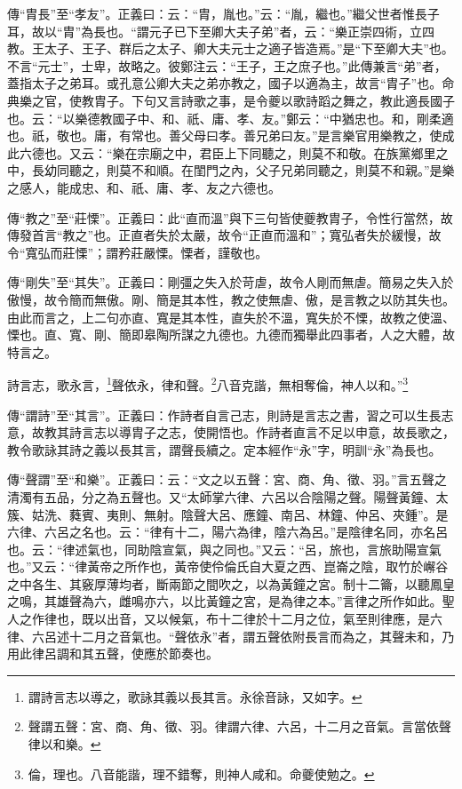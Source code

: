{\noindent\zhuan{}\fzbyks 傳“胄長”至“孝友”。正義曰：云：“胄，胤也。”云：“胤，繼也。”繼父世者惟長子耳，故以“胄”為長也。“謂元子已下至卿大夫子弟”者，云：“樂正崇四術，立四教。王太子、王子、群后之太子、卿大夫元士之適子皆造焉。”是“下至卿大夫”也。不言“元士”，士卑，故略之。彼鄭注云：“王子，王之庶子也。”此傳兼言“弟”者，蓋指太子之弟耳。或孔意公卿大夫之弟亦教之，國子以適為主，故言“胄子”也。命典樂之官，使教胄子。下句又言詩歌之事，是令夔以歌詩蹈之舞之，教此適長國子也。云：“以樂德教國子中、和、祇、庸、孝、友。”鄭云：“中猶忠也。和，剛柔適也。祇，敬也。庸，有常也。善父母曰孝。善兄弟曰友。”是言樂官用樂教之，使成此六德也。又云：“樂在宗廟之中，君臣上下同聽之，則莫不和敬。在族黨鄉里之中，長幼同聽之，則莫不和順。在閨門之內，父子兄弟同聽之，則莫不和親。”是樂之感人，能成忠、和、祇、庸、孝、友之六德也。 \par}

{\noindent\zhuan{}\fzbyks 傳“教之”至“莊慄”。正義曰：此“直而溫”與下三句皆使夔教胄子，令性行當然，故傳發首言“教之”也。正直者失於太嚴，故令“正直而溫和”；寬弘者失於緩慢，故令“寬弘而莊慄”；謂矜莊嚴慄。慄者，謹敬也。 \par}

{\noindent\zhuan{}\fzbyks 傳“剛失”至“其失”。正義曰：剛彊之失入於苛虐，故令人剛而無虐。簡易之失入於傲慢，故令簡而無傲。剛、簡是其本性，教之使無虐、傲，是言教之以防其失也。由此而言之，上二句亦直、寬是其本性，直失於不溫，寬失於不慄，故教之使溫、慄也。直、寬、剛、簡即皋陶所謀之九德也。九德而獨舉此四事者，人之大體，故特言之。 \par}

詩言志，歌永言，\footnote{謂詩言志以導之，歌詠其義以長其言。永徐音詠，又如字。}聲依永，律和聲。\footnote{聲謂五聲：宮、商、角、徵、羽。律謂六律、六呂，十二月之音氣。言當依聲律以和樂。}八音克諧，無相奪倫，神人以和。”\footnote{倫，理也。八音能諧，理不錯奪，則神人咸和。命夔使勉之。}

{\noindent\zhuan{}\fzbyks 傳“謂詩”至“其言”。正義曰：作詩者自言己志，則詩是言志之書，習之可以生長志意，故教其詩言志以導胄子之志，使開悟也。作詩者直言不足以申意，故長歌之，教令歌詠其詩之義以長其言，謂聲長續之。定本經作“永”字，明訓“永”為長也。 \par}

{\noindent\zhuan{}\fzbyks 傳“聲謂”至“和樂”。正義曰：云：“文之以五聲：宮、商、角、徵、羽。”言五聲之清濁有五品，分之為五聲也。又“太師掌六律、六呂以合陰陽之聲。陽聲黃鐘、太簇、姑洗、蕤賓、夷則、無射。陰聲大呂、應鐘、南呂、林鐘、仲呂、夾鍾”。是六律、六呂之名也。云：“律有十二，陽六為律，陰六為呂。”是陰律名同，亦名呂也。云：“律述氣也，同助陰宣氣，與之同也。”又云：“呂，旅也，言旅助陽宣氣也。”又云：“律黃帝之所作也，黃帝使伶倫氏自大夏之西、崑崙之陰，取竹於嶰谷之中各生、其竅厚薄均者，斷兩節之間吹之，以為黃鐘之宮。制十二籥，以聽鳳皇之鳴，其雄聲為六，雌鳴亦六，以比黃鐘之宮，是為律之本。”言律之所作如此。聖人之作律也，既以出音，又以候氣，布十二律於十二月之位，氣至則律應，是六律、六呂述十二月之音氣也。“聲依永”者，謂五聲依附長言而為之，其聲未和，乃用此律呂調和其五聲，使應於節奏也。 \par}

